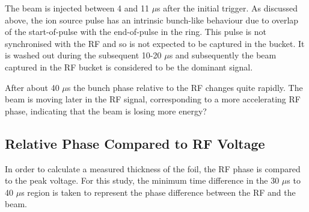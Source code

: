 \documentclass{paper}
\begin{document}
The beam is injected between 4 and 11 $\mu$s after
the initial trigger. As discussed above, the ion source pulse has an intrinsic 
bunch-like behaviour due to overlap of the start-of-pulse with the end-of-pulse 
in the ring. This pulse is not synchronised with the RF and so is not expected to be
captured in the bucket. It is washed out during the subsequent 10-20 $\mu$s and
subsequently the beam captured in the RF bucket is considered to be the dominant
signal.

After about 40 $\mu$s the bunch phase relative to the RF changes quite rapidly.
The beam is moving later in the RF signal, corresponding to a more accelerating
RF phase, indicating that the beam is losing more energy?

\subsection{Relative Phase Compared to RF Voltage}
In order to calculate a measured thickness of the foil, the RF phase is compared
to the peak voltage. For this study, the minimum time difference in the 30 
$\mu$s to 40 $\mu$s region is taken to represent the phase difference between 
the RF and the beam.
\end{document}
